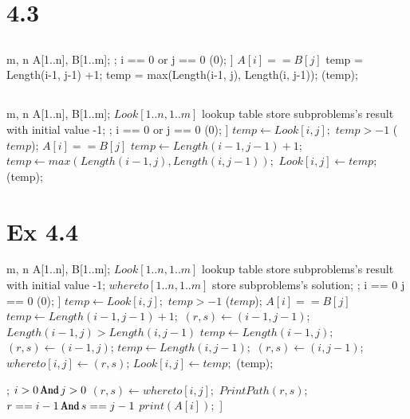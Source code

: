 \section{4.3}
\subsection{}
\Prog\qq
\Global m, n A[1..n], B[1..m];\qq
{}; \p
\If i == 0 or j == 0 \Then\p
\Return(0);\p
\Endif]\p
\If $A[i] == B[j]$ \Then\p
temp = Length(i-1, j-1) +1;\p
\Else\p
temp = max(Length(i-1, j), Length(i, j-1));\p
\Endif\p
\Return(temp);\qq
\Fini 

\subsection{}
\Prog\qq
\Global m, n A[1..n], B[1..m];\qq
\Global $Look[1..n,1..m]$ lookup table store subproblems's result  with initial value -1;\qq
{}; \p
\If i == 0 or j == 0 \Then\p
\Return(0);\p
\Endif]\p
$temp \leftarrow Look[i, j];$\p
\If $temp > -1 $ \Then\p
\Return($temp$);\p
\Endif\p
\If $A[i] == B[j]$ \Then\p
$temp \leftarrow Length(i-1, j-1) +1;$\p
\Else\p
$temp \leftarrow max(Length(i-1, j), Length(i, j-1));$\p
\Endif\p
$Look[i, j] \leftarrow temp;$\p
\Return(temp);\qq
\Fini 


\section{Ex 4.4}

\Prog\qq
\Global m, n A[1..n], B[1..m];\qq
\Global $Look[1..n,1..m]$ lookup table store subproblems's result  with initial value -1;\qq
\Global $whereto[1..n,1..m]$ store subproblems's solution;\qq
{}; \p
\If i == 0 \Or j == 0 \Then\p
\Return(0);\p
\Endif]\p
$temp \leftarrow Look[i, j];$\p
\If $temp > -1 $ \Then\p
\Return($temp$);\p
\Endif\p
\If $A[i] == B[j]$ \Then\p
$temp \leftarrow Length(i-1, j-1) +1;$\p
$(r, s) \leftarrow (i-1, j-1)$;\p
\Elseif $Length(i-1, j) >  Length(i, j-1)$ \Then\p
$temp \leftarrow Length(i-1, j);$\p
$(r, s) \leftarrow (i-1, j)$;\p
\Else\p
$temp \leftarrow Length(i, j-1);$\p
$(r, s) \leftarrow (i, j-1)$;\p
\Endif\p
$whereto[i, j] \leftarrow (r ,s)$;\p
$Look[i, j] \leftarrow temp;$\p
\Return(temp);\qq
\Fini 



\Prog\qq
{}; \p
\If$i > 0 \And j > 0$ \Then\p
$(r, s) \leftarrow whereto[i, j];$\p
$PrintPath(r, s)$;\p
\If $r == i-1 \And s == j-1$\Then\p
$print(A[i]);$\p
\Endif\p
\Endif]\qq
\Fini 







 


